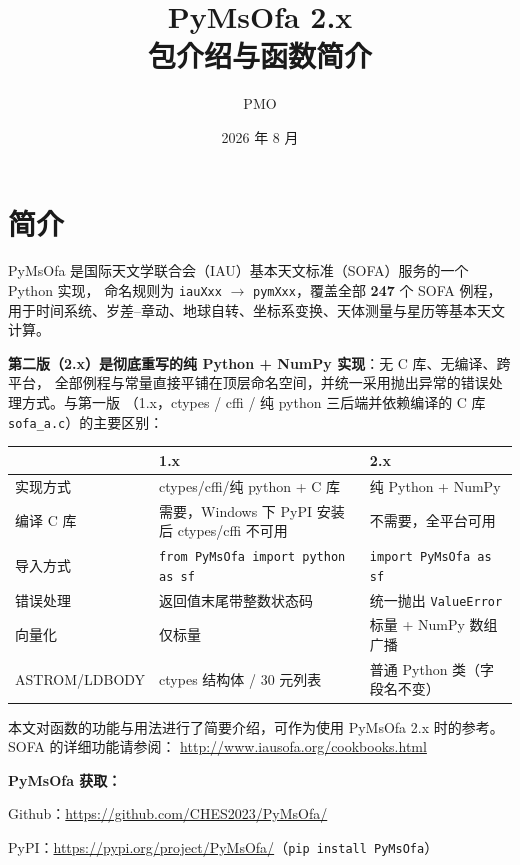 \documentclass[11pt]{article}
\title{\bfseries PyMsOfa 2.x\\ 包介绍与函数简介}
\author{PMO}
\date{2026 年 8 月}
\begin{document}
\maketitle
\tableofcontents
\newpage

\section{简介}

PyMsOfa 是国际天文学联合会（IAU）基本天文标准（SOFA）服务的一个 Python 实现，
命名规则为 \texttt{iauXxx} $\rightarrow$ \texttt{pymXxx}，覆盖全部 \textbf{247} 个 SOFA
例程，用于时间系统、岁差--章动、地球自转、坐标系变换、天体测量与星历等基本天文计算。

\textbf{第二版（2.x）是彻底重写的纯 Python + NumPy 实现}：无 C 库、无编译、跨平台，
全部例程与常量直接平铺在顶层命名空间，并统一采用抛出异常的错误处理方式。与第一版
（1.x，ctypes / cffi / 纯 python 三后端并依赖编译的 C 库 \texttt{sofa\_a.c}）的主要区别：

\begin{table}[H]
\centering
\begin{tabular}{|l|l|l|}
\hline
 & 1.x & 2.x \\ \hline
实现方式 & ctypes/cffi/纯 python + C 库 & 纯 Python + NumPy \\ \hline
编译 C 库 & 需要，Windows 下 PyPI 安装后 ctypes/cffi 不可用 & 不需要，全平台可用 \\ \hline
导入方式 & \texttt{from PyMsOfa import python as sf} & \texttt{import PyMsOfa as sf} \\ \hline
错误处理 & 返回值末尾带整数状态码 & 统一抛出 \texttt{ValueError} \\ \hline
向量化 & 仅标量 & 标量 + NumPy 数组广播 \\ \hline
ASTROM/LDBODY & ctypes 结构体 / 30 元列表 & 普通 Python 类（字段名不变） \\ \hline
\end{tabular}
\end{table}

本文对函数的功能与用法进行了简要介绍，可作为使用 PyMsOfa 2.x 时的参考。
SOFA 的详细功能请参阅：
\href{http://www.iausofa.org/cookbooks.html}{http://www.iausofa.org/cookbooks.html}

\textbf{PyMsOfa 获取：}

Github：\href{https://github.com/CHES2023/PyMsOfa/}{https://github.com/CHES2023/PyMsOfa/}

PyPI：\href{https://pypi.org/project/PyMsOfa/}{https://pypi.org/project/PyMsOfa/}（\texttt{pip install PyMsOfa}）
\end{document}
